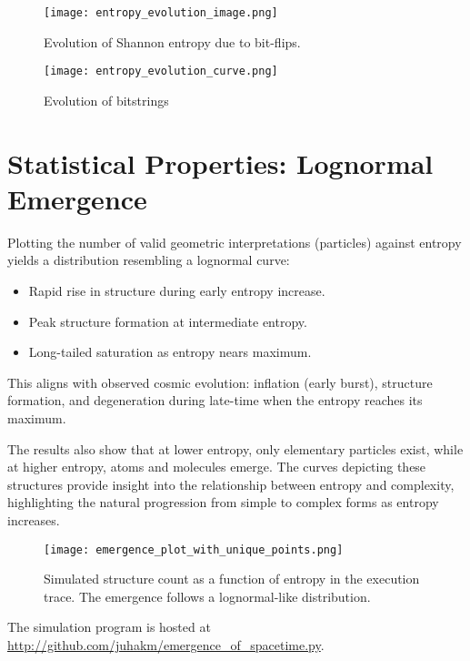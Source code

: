 \documentclass[11pt]{article}
\begin{document}
\begin{figure}[h!]
   \centering
   \texttt{[image: entropy\_evolution\_image.png]}
   \caption{Evolution of Shannon entropy due to bit-flips.}
   \label{fig:Evolution of entropy due to bit-flips}
\end{figure}


\begin{figure}[h!]
   \centering
   \texttt{[image: entropy\_evolution\_curve.png]}
   \caption{Evolution of bitstrings}
   \label{fig:Evolution of bitstrings due to bit-flips}
\end{figure}

\section{Statistical Properties: Lognormal Emergence}
Plotting the number of valid geometric interpretations (particles) against entropy yields a distribution resembling a lognormal curve:
\begin{itemize}
   \item Rapid rise in structure during early entropy increase.
   \item Peak structure formation at intermediate entropy.
   \item Long-tailed saturation as entropy nears maximum.
\end{itemize}

This aligns with observed cosmic evolution: inflation (early burst), structure formation, and degeneration during late-time
when the entropy reaches its maximum.

The results also show that at lower entropy, only elementary particles exist, while at higher entropy, atoms and molecules emerge.
The curves depicting these structures provide insight into the relationship between entropy and complexity, highlighting
the natural progression from simple to complex forms as entropy increases.

\begin{figure}[h!]
   \centering
   \texttt{[image: emergence\_plot\_with\_unique\_points.png]}
   \caption{Simulated structure count as a function of entropy in the execution trace. The emergence follows a lognormal-like distribution.}
   \label{fig:lognormal-structure}
\end{figure}

The simulation program is hosted at \url{http://github.com/juhakm/emergence_of_spacetime.py}.
\end{document}
